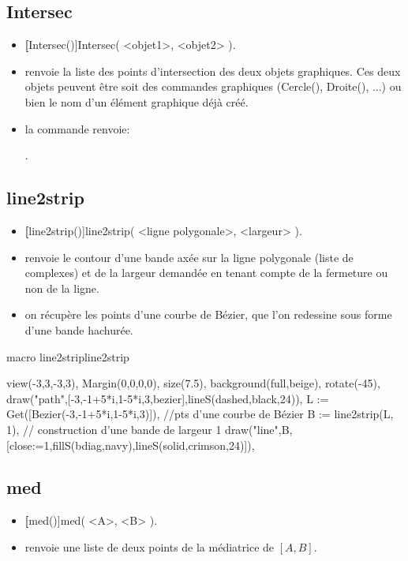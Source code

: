 \subsection{Intersec}
\begin{itemize}
 \item \util \textbf[Intersec()]{Intersec( <objet1>, <objet2> )}.
 \item \desc renvoie la liste des points d'intersection des deux objets graphiques. Ces deux objets peuvent être soit des commandes graphiques (Cercle(), Droite(), ...) ou bien le nom d'un élément graphique déjà créé.
 \item \exem la commande  renvoie:

\centerline{\res{[0.59851109463416+0.79925554731708*i, -0.99794539275033+0.00102730362483*i]}.}
\end{itemize}

\subsection{line2strip}
\begin{itemize}
 \item \util \textbf[line2strip()]{line2strip( <ligne polygonale>, <largeur> )}.
 \item \desc renvoie le contour d'une bande axée sur la ligne polygonale (liste de complexes) et de la largeur demandée en tenant compte de la fermeture ou non de la ligne.
 \item \exem on récupère les points d'une courbe de Bézier, que l'on redessine sous forme d'une bande hachurée.
\end{itemize}

\begin{demo}{macro line2strip}{line2strip}
\begin{texgraph}[name=line2strip]
view(-3,3,-3,3), Margin(0,0,0,0), size(7.5),
background(full,beige),
rotate(-45),
draw("path",[-3,-1+5*i,1-5*i,3,bezier],lineS(dashed,black,24)),
L := Get([Bezier(-3,-1+5*i,1-5*i,3)]), //pts d'une courbe de Bézier
B := line2strip(L, 1), // construction d'une bande de largeur 1
draw("line",B, [close:=1,fillS(bdiag,navy),lineS(solid,crimson,24)]),
\end{texgraph}
\end{demo}


\subsection{med}
\begin{itemize}
 \item \util \textbf[med()]{med( <A>, <B> )}.
 \item \desc renvoie une liste de deux points de la médiatrice de $[A,B]$.
\end{itemize}

